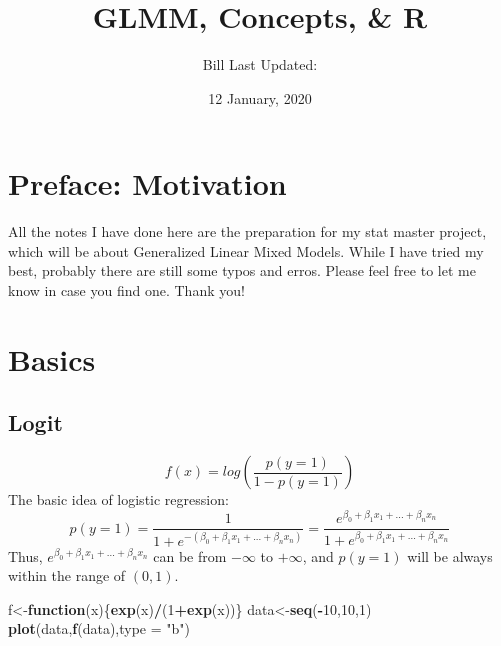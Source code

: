 \documentclass[]{book}
\title{GLMM, Concepts, \& R}
\author{Bill Last Updated:}
\date{12 January, 2020}
\newenvironment{Shaded}{\begin{snugshade}}{\end{snugshade}}
\newcommand{\KeywordTok}[1]{\textcolor[rgb]{0.13,0.29,0.53}{\textbf{#1}}}
\newcommand{\DataTypeTok}[1]{\textcolor[rgb]{0.13,0.29,0.53}{#1}}
\newcommand{\DecValTok}[1]{\textcolor[rgb]{0.00,0.00,0.81}{#1}}
\newcommand{\StringTok}[1]{\textcolor[rgb]{0.31,0.60,0.02}{#1}}
\newcommand{\ControlFlowTok}[1]{\textcolor[rgb]{0.13,0.29,0.53}{\textbf{#1}}}
\newcommand{\OperatorTok}[1]{\textcolor[rgb]{0.81,0.36,0.00}{\textbf{#1}}}
\newcommand{\NormalTok}[1]{#1}
\begin{document}
\maketitle

{
\setcounter{tocdepth}{1}
\tableofcontents
}
\chapter*{Preface: Motivation}\label{my-section}

All the notes I have done here are the preparation for my stat master
project, which will be about Generalized Linear Mixed Models. While I
have tried my best, probably there are still some typos and erros.
Please feel free to let me know in case you find one. Thank you!

\chapter{Basics}\label{basics}

\section{Logit}\label{logit}

\[f(x)=log(\frac{p(y=1)}{1-p(y=1)})\] The basic idea of logistic
regression:
\[p(y=1)=\frac{1}{1+e^{-(\beta_0+\beta_1x_1+...+\beta_nx_n)}}=\frac{e^{\beta_0+\beta_1x_1+...+\beta_nx_n}}{1+e^{\beta_0+\beta_1x_1+...+\beta_nx_n}}\]
Thus, \(e^{\beta_0+\beta_1x_1+...+\beta_nx_n}\) can be from \(-\infty\)
to \(+\infty\), and \(p(y=1)\) will be always within the range of
\((0,1)\).

\begin{Shaded}
\begin{Highlighting}[]
\NormalTok{f<-}\ControlFlowTok{function}\NormalTok{(x)\{}\KeywordTok{exp}\NormalTok{(x)}\OperatorTok{/}\NormalTok{(}\DecValTok{1}\OperatorTok{+}\KeywordTok{exp}\NormalTok{(x))\}}
\NormalTok{data<-}\KeywordTok{seq}\NormalTok{(}\OperatorTok{-}\DecValTok{10}\NormalTok{,}\DecValTok{10}\NormalTok{,}\DecValTok{1}\NormalTok{)}
\KeywordTok{plot}\NormalTok{(data,}\KeywordTok{f}\NormalTok{(data),}\DataTypeTok{type =} \StringTok{"b"}\NormalTok{)}
\end{Highlighting}
\end{Shaded}
\end{document}
